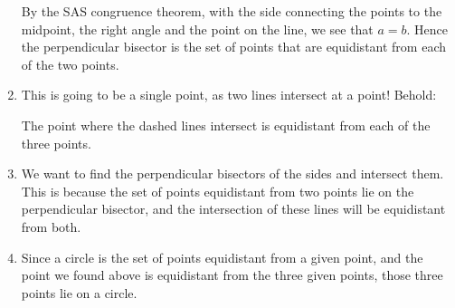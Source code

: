 \documentclass[nooutcomes,noauthor,handout,12pt]{ximera}
\begin{document}
\begin{question}
\begin{freeResponse}
\begin{enumerate}
\begin{center}
      \end{center}
      By the SAS congruence theorem, with the side connecting the
      points to the midpoint, the right angle and the point on the
      line, we see that $a=b$. Hence the perpendicular bisector is the
      set of points that are equidistant from each of the two points.
    \item This is going to be a single point, as two lines intersect
      at a point! Behold:
      \begin{center}
      \end{center}
      The point where the dashed lines intersect is equidistant from
      each of the three points.
    \item We want to find the perpendicular bisectors of the sides and
      intersect them. This is because the set of points equidistant
      from two points lie on the perpendicular bisector, and the
      intersection of these lines will be equidistant from both.
    \item Since a circle is the set of points equidistant from a given
      point, and the point we found above is equidistant from the
      three given points, those three points lie on a circle.
    \end{enumerate}
  \end{freeResponse}
\end{question}
\end{document}

